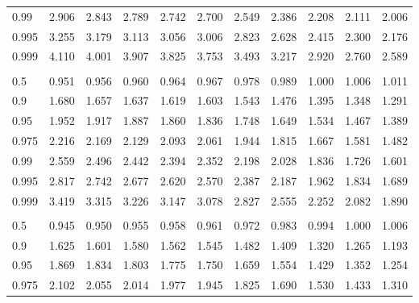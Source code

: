 \documentclass[
]{article}
\begin{document}
\begin{table}[H]
\begin{tabular}{lrrrrrrrrrr}
\hspace{1em}0.99 & 2.906 & 2.843 & 2.789 & 2.742 & 2.700 & 2.549 & 2.386 & 2.208 & 2.111 & 2.006\\
\hspace{1em}0.995 & 3.255 & 3.179 & 3.113 & 3.056 & 3.006 & 2.823 & 2.628 & 2.415 & 2.300 & 2.176\\
\hspace{1em}0.999 & 4.110 & 4.001 & 3.907 & 3.825 & 3.753 & 3.493 & 3.217 & 2.920 & 2.760 & 2.589\\
\addlinespace[0.3em]
\multicolumn{11}{l}{\textbf{$k_2=60$}}\\
\hspace{1em}0.5 & 0.951 & 0.956 & 0.960 & 0.964 & 0.967 & 0.978 & 0.989 & 1.000 & 1.006 & 1.011\\
\hspace{1em}0.9 & 1.680 & 1.657 & 1.637 & 1.619 & 1.603 & 1.543 & 1.476 & 1.395 & 1.348 & 1.291\\
\hspace{1em}0.95 & 1.952 & 1.917 & 1.887 & 1.860 & 1.836 & 1.748 & 1.649 & 1.534 & 1.467 & 1.389\\
\hspace{1em}0.975 & 2.216 & 2.169 & 2.129 & 2.093 & 2.061 & 1.944 & 1.815 & 1.667 & 1.581 & 1.482\\
\hspace{1em}0.99 & 2.559 & 2.496 & 2.442 & 2.394 & 2.352 & 2.198 & 2.028 & 1.836 & 1.726 & 1.601\\
\hspace{1em}0.995 & 2.817 & 2.742 & 2.677 & 2.620 & 2.570 & 2.387 & 2.187 & 1.962 & 1.834 & 1.689\\
\hspace{1em}0.999 & 3.419 & 3.315 & 3.226 & 3.147 & 3.078 & 2.827 & 2.555 & 2.252 & 2.082 & 1.890\\
\addlinespace[0.3em]
\multicolumn{11}{l}{\textbf{$k_2=120$}}\\
\hspace{1em}0.5 & 0.945 & 0.950 & 0.955 & 0.958 & 0.961 & 0.972 & 0.983 & 0.994 & 1.000 & 1.006\\
\hspace{1em}0.9 & 1.625 & 1.601 & 1.580 & 1.562 & 1.545 & 1.482 & 1.409 & 1.320 & 1.265 & 1.193\\
\hspace{1em}0.95 & 1.869 & 1.834 & 1.803 & 1.775 & 1.750 & 1.659 & 1.554 & 1.429 & 1.352 & 1.254\\
\hspace{1em}0.975 & 2.102 & 2.055 & 2.014 & 1.977 & 1.945 & 1.825 & 1.690 & 1.530 & 1.433 & 1.310\\

\end{tabular}
\end{table}
\end{document}

